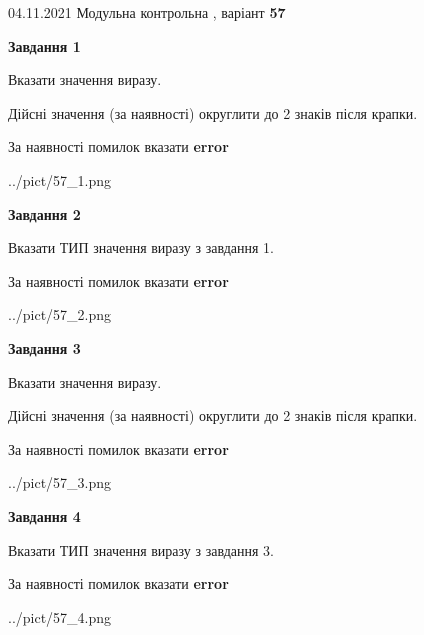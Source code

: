 \documentclass[11pt, ukrainian]{article}
\begin{document}
{04.11.2021 Модульна контрольна , варіант  \No \textbf { 57 }\par}
{
\begin {large}
{\begin {center}\textbf{Завдання 1}\end {center}}\par
Вказати значення виразу. \par
Дійсні значення (за наявності) округлити до 2 знаків після крапки. \par
За наявності помилок вказати \textbf{error}

\begin{center}
	{../pict/57_1.png}
\end{center}
\newpage

{\begin {center}\textbf{Завдання 2}\end {center}}\par
Вказати ТИП значення виразу з завдання 1. \par
За наявності помилок вказати \textbf{error}

\begin{center}
	{../pict/57_2.png}
\end{center}
\newpage

{\begin {center}\textbf{Завдання 3}\end {center}}\par
Вказати значення виразу. \par
Дійсні значення (за наявності) округлити до 2 знаків після крапки. \par
За наявності помилок вказати \textbf{error}

\begin{center}
	{../pict/57_3.png}
\end{center}
\newpage

{\begin {center}\textbf{Завдання 4}\end {center}}\par
Вказати ТИП значення виразу з завдання 3. \par
За наявності помилок вказати \textbf{error}

\begin{center}
	{../pict/57_4.png}
\end{center}
\newpage


\end{large}}
\end{document}
